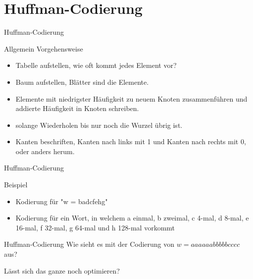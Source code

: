	\section{Huffman-Codierung}
	\begin{frame}{Huffman-Codierung}
		\begin{block}{Allgemein Vorgehensweise}
			\begin{itemize}
				\item Tabelle aufstellen, wie oft kommt jedes Element vor?
				
				\pause
				\item Baum aufstellen, Blätter sind die Elemente.
				
				\pause
				\item Elemente mit niedrigster Häufigkeit zu neuem Knoten
				 zusammenführen und addierte Häufigkeit in Knoten schreiben.
				 
				\pause
				\item solange Wiederholen bis nur noch die Wurzel übrig ist.
				
				\pause
				\item Kanten beschriften, Kanten nach links mit 1 und Kanten nach rechts mit 0, oder anders herum.
					
			\end{itemize}
		\end{block}
	\end{frame}
		
	\begin{frame}{Huffman-Codierung}
		\begin{exampleblock}{Beispiel}
			\begin{itemize}
			\item Kodierung für "w = badcfehg"
			
			\pause
			\item Kodierung für ein Wort, in welchem a einmal, b zweimal, c 4-mal, d 8-mal, e 16-mal, f 32-mal, g 64-mal und h 128-mal vorkommt
			\end{itemize}
		\end{exampleblock}
	\end{frame}	
	
	
	\begin{frame}{Huffman-Codierung}
		Wie sieht es mit der Codierung von $w = aaaaaabbbbbcccc$ aus?\\
		\vspace{15pt}
		
		 {
			Lässt sich das ganze noch optimieren?
		}
	\end{frame}		
	
